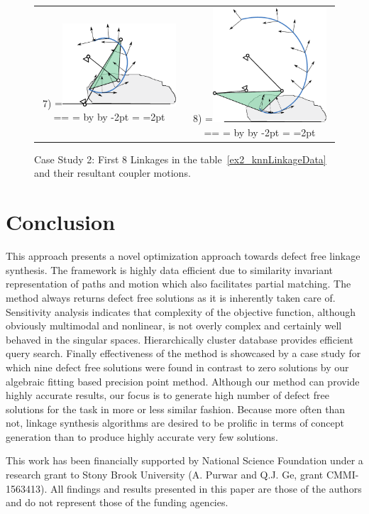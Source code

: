 \documentclass[twocolumn,10pt]{asme2e}
\makeatletter
\newcommand{\putindeepbox}[2][0.7\baselineskip]{{%
    \setbox0=\hbox{#2}%
    \setbox0=\vbox{\noindent\hsize=\wd0\unhbox0}
    \@tempdima=\dp0
    \advance\@tempdima by \ht0
    \advance\@tempdima by -#1\relax
    \dp0=\@tempdima
    \ht0=#1\relax
    \box0
}}
\makeatother
\begin{document}
\begin{figure}
\begin{tabular}{cc}
  7)\putindeepbox[2pt]{\includegraphics[width=120pt]{figure/sol8.eps}}
    & 8)\putindeepbox[2pt]{\includegraphics[width=120pt]{figure/sol9.eps}}\\
\end{tabular}
\caption{Case Study 2: First 8 Linkages in the table~\ref{ex2_knnLinkageData} and their resultant coupler motions.}
\label{ex2_solns}
\end{figure}


\section*{Conclusion}
This approach presents a novel optimization approach towards defect free linkage synthesis.
The framework is highly data efficient due to similarity invariant representation of paths and motion which also facilitates partial matching.
The method always returns defect free solutions as it is inherently taken care of.
Sensitivity analysis indicates that complexity of the objective function, although obviously multimodal and nonlinear, is not overly complex and certainly well behaved in the singular spaces.
Hierarchically cluster database provides efficient query search.
Finally effectiveness of the method is showcased by a case study for which nine defect free solutions were found in contrast to zero solutions by our algebraic fitting based precision point method.
Although our method can provide highly accurate results, our focus is to generate high number of defect free solutions for the task in more or less similar fashion.
Because more often than not, linkage synthesis algorithms are desired to be prolific in terms of concept generation than to produce highly accurate very few solutions.

\begin{acknowledgment}
This work has been financially supported by National Science Foundation under a research grant to Stony Brook University (A. Purwar and Q.J. Ge, grant CMMI-1563413). All findings and results presented in this paper are those of the authors and do not represent those of the funding agencies.
\end{acknowledgment}



\newpage
\clearpage
\listoftables
\listoffigures
\end{document}
